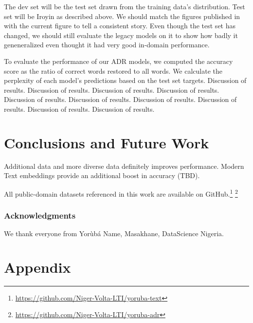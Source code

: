 \documentclass{article} %
\begin{document}
The dev set will be the test set drawn from the training data's distribution. Test set will be Iroyin as described above. We should match the figures published in \citep{orife2018adr} with the current figure to tell a consistent story. Even though the test set has changed, we should still evaluate the legacy models on it to show how badly it geneneralized even thought it had very good in-domain performance.

To evaluate the performance of our ADR models, we computed the accuracy score as the ratio of correct words restored to all words. We calculate the perplexity of each model's predictions based on the test set targets.
Discussion of results. Discussion of results. Discussion of results. Discussion of results. Discussion of results. Discussion of results. Discussion of results. Discussion of results. Discussion of results. Discussion of results. 

\section{Conclusions and Future Work}

Additional data and more diverse data definitely improves performance. Modern Text embeddings provide an additional boost in accuracy (TBD).


All public-domain datasets referenced in this work are available on GitHub.\footnote{\url{https://github.com/Niger-Volta-LTI/yoruba-text}} \footnote{\url{https://github.com/Niger-Volta-LTI/yoruba-adr}}

\subsubsection*{Acknowledgments}
We thank everyone from Yor{\`u}b{\'a} Name, Masakhane, DataScience Nigeria. 




\clearpage

\appendix
\section{Appendix}
\end{document}

